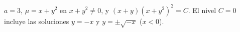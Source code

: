 $a=3$, $\mu=x+y^2$ en $x+y^2\ne0$, y $(x+y)(x+y^2)^2=C$. El nivel $C=0$ incluye las soluciones $y=-x$ y $y=\pm\sqrt{-x}$ ($x<0$).
